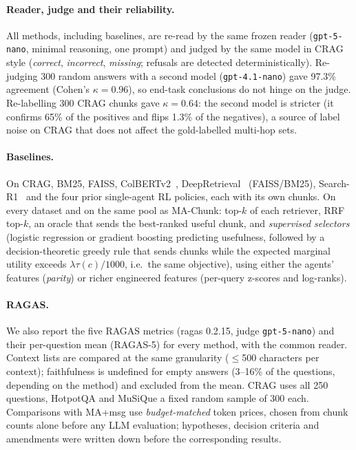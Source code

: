 \documentclass[sigconf,anonymous]{aamas}
\newcommand{\method}{MA-Chunk}
\theoremstyle{plain}
\theoremstyle{definition}
\begin{document}
\paragraph{Reader, judge and their reliability.}
All methods, including baselines, are re-read by the same frozen reader (\texttt{gpt-5-nano}, minimal reasoning, one prompt) and judged by the same model in CRAG style (\emph{correct}, \emph{incorrect}, \emph{missing}; refusals are detected deterministically). Re-judging 300 random answers with a second model (\texttt{gpt-4.1-nano}) gave 97.3\% agreement (Cohen's $\kappa=0.96$), so end-task conclusions do not hinge on the judge. Re-labelling 300 CRAG chunks gave $\kappa=0.64$: the second model is stricter (it confirms 65\% of the positives and flips 1.3\% of the negatives), a source of label noise on CRAG that does not affect the gold-labelled multi-hop sets.

\paragraph{Baselines.}
On CRAG, BM25, FAISS, ColBERTv2~\cite{santhanam2022colbertv2}, DeepRetrieval~\cite{jiang2025deepretrieval} (FAISS/BM25), Search-R1~\cite{jin2025searchr1} and the four prior single-agent RL policies, each with its own chunks. On every dataset and on the same pool as \method{}: top-$k$ of each retriever, RRF top-$k$, an oracle that sends the best-ranked useful chunk, and \emph{supervised selectors} (logistic regression or gradient boosting predicting usefulness, followed by a decision-theoretic greedy rule that sends chunks while the expected marginal utility exceeds $\lambda\tau(c)/1000$, i.e.\ the same objective), using either the agents' features (\emph{parity}) or richer engineered features (per-query z-scores and log-ranks).

\paragraph{RAGAS.}
We also report the five RAGAS metrics (ragas 0.2.15, judge \texttt{gpt-5-nano}) and their per-question mean (RAGAS-5) for every method, with the common reader. Context lists are compared at the same granularity ($\le$500 characters per context); faithfulness is undefined for empty answers (3--16\% of the questions, depending on the method) and excluded from the mean. CRAG uses all 250 questions, HotpotQA and MuSiQue a fixed random sample of 300 each. Comparisons with MA+msg use \emph{budget-matched} token prices, chosen from chunk counts alone before any LLM evaluation; hypotheses, decision criteria and amendments were written down before the corresponding results.
\end{document}
